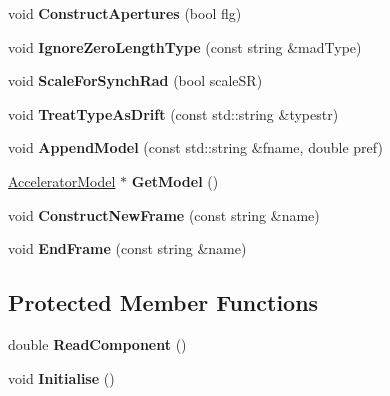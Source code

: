 \begin{DoxyCompactItemize}
void {\bfseries Construct\+Apertures} (bool flg)
\item 
\mbox{\label{classMADInterface_a74261494d192474c43f0dd3577ffa7e8}} 
void {\bfseries Ignore\+Zero\+Length\+Type} (const string \&mad\+Type)
\item 
\mbox{\label{classMADInterface_a5f9cd10f2e8d5371cf34e3dbf167fa72}} 
void {\bfseries Scale\+For\+Synch\+Rad} (bool scale\+SR)
\item 
\mbox{\label{classMADInterface_a7e0fbeb4772d867f0126ee63c92547e8}} 
void {\bfseries Treat\+Type\+As\+Drift} (const std\+::string \&typestr)
\item 
\mbox{\label{classMADInterface_a093ee774fb5a1237872b7fea3d9c3746}} 
void {\bfseries Append\+Model} (const std\+::string \&fname, double pref)
\item 
\mbox{\label{classMADInterface_a4d9b830ead435b36a3d16e965dc4cb26}} 
\hyperlink{classAcceleratorModel}{Accelerator\+Model} $\ast$ {\bfseries Get\+Model} ()
\item 
\mbox{\label{classMADInterface_a1a7cb78ddf64a25920067637cbd82ec0}} 
void {\bfseries Construct\+New\+Frame} (const string \&name)
\item 
\mbox{\label{classMADInterface_abe0f2699c216150de8568551ec20ddc0}} 
void {\bfseries End\+Frame} (const string \&name)
\end{DoxyCompactItemize}
\subsection*{Protected Member Functions}
\begin{DoxyCompactItemize}
\item 
\mbox{\label{classMADInterface_ad05b1c2a40e639a4727db03cf012d8bf}} 
double {\bfseries Read\+Component} ()
\item 
\mbox{\label{classMADInterface_a91ec92a381cf1998b15036a50d321a50}} 
void {\bfseries Initialise} ()
\end{DoxyCompactItemize}
